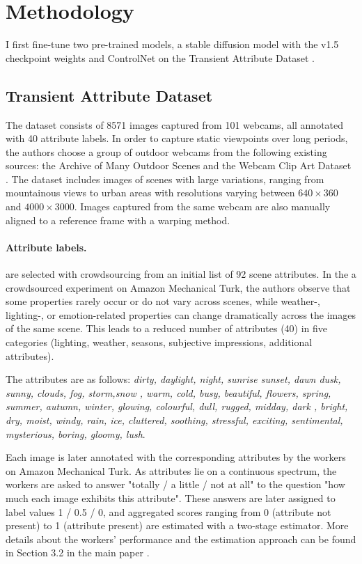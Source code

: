 \section{Methodology}
I first fine-tune two pre-trained models,  a stable diffusion model with the v1.5 checkpoint weights \cite{rombach2022high} and ControlNet \cite{zhang2023adding} on the Transient Attribute Dataset \cite{laffont2014transient}. 

\subsection{Transient Attribute Dataset} 

The dataset consists of  8571 images captured from 101 webcams, all annotated with 40 attribute labels. In order to capture static viewpoints over long periods, the authors choose a group of outdoor webcams from the following existing sources: the Archive of Many Outdoor Scenes \cite{jacobs2007consistent} and the Webcam Clip Art Dataset \cite{lalonde2009webcam}. The dataset includes images of scenes with large variations, ranging from  mountainous views to urban areas with resolutions varying between $640 \times 360$ and $4000 \times 3000$. Images captured from the same webcam are also manually aligned to a reference frame with a warping method.
\paragraph{Attribute labels.} are selected with crowdsourcing from an initial list of 92 scene attributes. In the a crowdsourced experiment on Amazon Mechanical Turk, the authors observe that some properties rarely occur or do not vary across scenes, while weather-, lighting-, or emotion-related properties can change dramatically across the images of the same scene. This leads  to a reduced number of attributes (40) in five categories (lighting, weather, seasons, subjective impressions, additional attributes).

The attributes are as follows: \textit{dirty, daylight, night, sunrise sunset, dawn dusk, sunny, clouds, fog, storm,snow
, warm, cold, busy, beautiful, flowers, spring, summer, autumn, winter, glowing, colourful, dull, rugged, midday, dark
, bright, dry, moist, windy, rain, ice, cluttered, soothing, stressful, exciting, sentimental, mysterious, boring, gloomy, lush}.

Each image is later annotated with the corresponding attributes by the workers on Amazon Mechanical Turk. As attributes lie on a continuous spectrum, the workers are asked to answer "totally / a little / not at all" to the question "how much each image exhibits this attribute". These answers are later assigned to label values 1 / 0.5 / 0, and aggregated scores ranging from 0 (attribute not present) to 1 (attribute present) are estimated with a two-stage estimator. More details about the workers' performance and the estimation approach can be found in Section 3.2 in the main paper \cite{laffont2014transient}.

